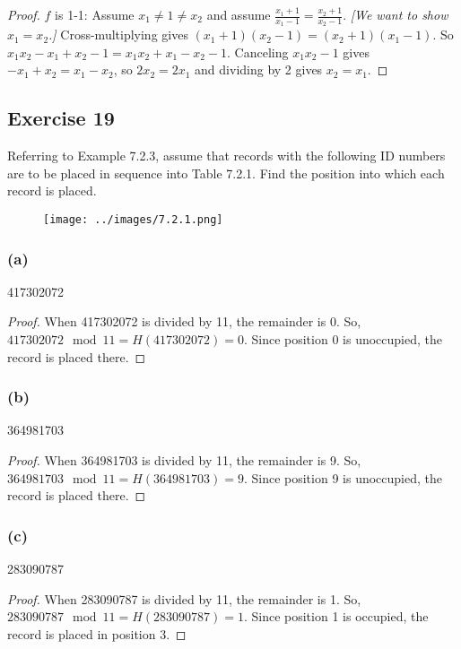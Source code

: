 \documentclass[14pt]{extarticle}
\begin{document}
\begin{proof}
    $f$ is 1-1: Assume \(x_1 \neq 1 \neq x_2\) and assume \(\frac{x_1+1}{x_1-1} = \frac{x_2+1}{x_2-1}\).
        {\it [We want to show \(x_1 = x_2\).]} Cross-multiplying gives \((x_1+1)(x_2-1) = (x_2+1)(x_1-1)\). So
    \(x_1x_2 - x_1 + x_2 - 1 = x_1x_2 + x_1 - x_2 - 1\). Canceling $x_1x_2 - 1$ gives \(-x_1 + x_2 = x_1 - x_2\), so
    \(2x_2 = 2x_1\) and dividing by 2 gives \(x_2 = x_1\).
\end{proof}

\subsection{Exercise 19}
Referring to Example 7.2.3, assume that records with the following ID numbers are to be placed in sequence into
Table 7.2.1. Find the position into which each record is placed.

\begin{figure}[ht!]
    \centering
    \texttt{[image: ../images/7.2.1.png]}
\end{figure}

\subsubsection{(a)}
417302072

\begin{proof}
    When 417302072 is divided by 11, the remainder is 0. So, \(417302072 \mod 11 = H(417302072) = 0\).
    Since position 0 is unoccupied, the record is placed there.
\end{proof}

\subsubsection{(b)}
364981703

\begin{proof}
    When 364981703 is divided by 11, the remainder is 9. So, \(364981703 \mod 11 = H(364981703) = 9\).
    Since position 9 is unoccupied, the record is placed there.
\end{proof}

\subsubsection{(c)}
283090787

\begin{proof}
    When 283090787 is divided by 11, the remainder is 1. So, \(283090787 \mod 11 = H(283090787) = 1\). Since position 1
    is occupied, the record is placed in position 3.
\end{proof}
\end{document}
